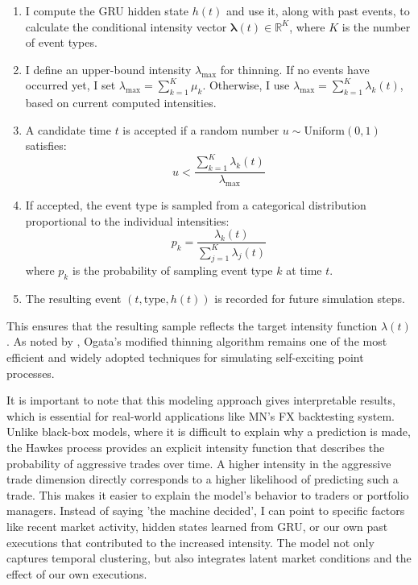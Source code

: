 \begin{enumerate}
    \item I compute the GRU hidden state \( h(t) \) and use it, along with past events, to calculate the conditional intensity vector \( \boldsymbol{\lambda}(t) \in \mathbb{R}^K \), where \( K \) is the number of event types.
    
    \item I define an upper-bound intensity \( \lambda_{\text{max}} \) for thinning. If no events have occurred yet, I set \( \lambda_{\text{max}} = \sum_{k=1}^{K} \mu_k \). Otherwise, I use \( \lambda_{\text{max}} = \sum_{k=1}^{K} \lambda_k(t) \), based on current computed intensities.

    \item A candidate time \( t \) is accepted if a random number \( u \sim \text{Uniform}(0,1) \) satisfies:
    \[
    u < \frac{\sum_{k=1}^{K} \lambda_k(t)}{\lambda_{\text{max}}}
    \]
    
    \item If accepted, the event type is sampled from a categorical distribution proportional to the individual intensities:
    \[
    p_k = \frac{\lambda_k(t)}{\sum_{j=1}^{K} \lambda_j(t)}
    \]
    where \( p_k \) is the probability of sampling event type \( k \) at time \( t \).

    \item The resulting event \( (t, \text{type}, h(t)) \) is recorded for future simulation steps.
\end{enumerate}
This ensures that the resulting sample reflects the target intensity function \( \lambda(t) \). As noted by \citet{magris_simulation_nodate}, Ogata's modified thinning algorithm remains one of the most efficient and widely adopted techniques for simulating self-exciting point processes.



It is important to note that this modeling approach gives interpretable results, which is essential for real-world applications like MN's FX backtesting system. Unlike black-box models, where it is difficult to explain why a prediction is made, the Hawkes process provides an explicit intensity function that describes the probability of aggressive trades over time. A higher intensity in the aggressive trade dimension directly corresponds to a higher likelihood of predicting such a trade. This makes it easier to explain the model's behavior to traders or portfolio managers. Instead of saying 'the machine decided', I can point to specific factors like recent market activity, hidden states learned from GRU, or our own past executions that contributed to the increased intensity. The model not only captures temporal clustering, but also integrates latent market conditions and the effect of our own executions.


